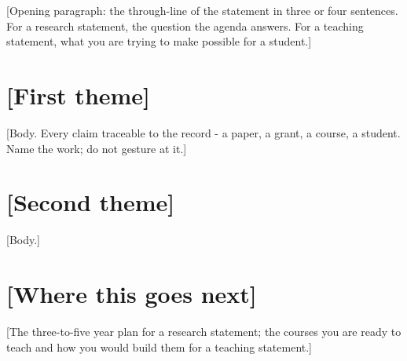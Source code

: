 \documentclass[11pt]{article}
\begin{document}

[Opening paragraph: the through-line of the statement in three or four
sentences. For a research statement, the question the agenda answers. For a
teaching statement, what you are trying to make possible for a student.]

\section{[First theme]}

[Body. Every claim traceable to the record - a paper, a grant, a course, a
student. Name the work; do not gesture at it.]

\section{[Second theme]}

[Body.]

\section{[Where this goes next]}

[The three-to-five year plan for a research statement; the courses you are
ready to teach and how you would build them for a teaching statement.]
\end{document}
